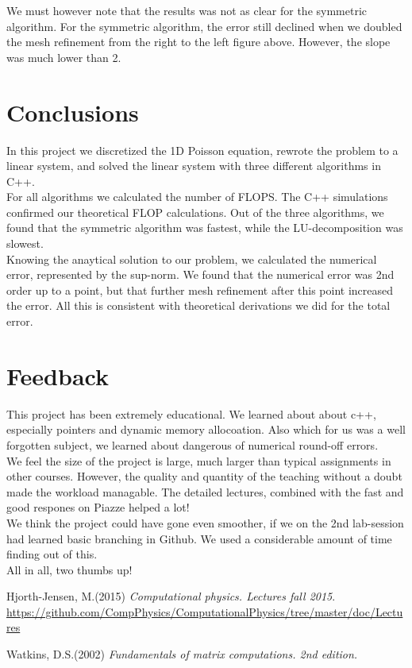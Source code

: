 \documentclass{article}
\begin{document}
We must however note that the results was not as clear for the symmetric algorithm. For the symmetric algorithm, the error still declined when we doubled the mesh refinement from the right to the left figure above. However, the slope was much lower than 2.

\section{Conclusions}
In this project we discretized the 1D Poisson equation, rewrote the problem to a linear system, and solved the linear system with three different algorithms in C++.\\

For all algorithms we calculated the number of FLOPS. The C++ simulations confirmed our theoretical FLOP calculations. Out of the three algorithms, we found that the symmetric algorithm was fastest, while the LU-decomposition was slowest. \\

Knowing the anaytical solution to our problem, we calculated the numerical error, represented by the sup-norm. We found that the numerical error was 2nd order up to a point, but that further mesh refinement after this point increased the error. All this is consistent with theoretical derivations we did for the total error. 

\section{Feedback}
This project has been extremely educational. We learned about about c++, especially pointers and dynamic memory allocoation. Also which for us was a well forgotten subject, we learned about dangerous of numerical round-off errors. \\

We feel the size of the project is large, much larger than typical assignments in other courses. However, the quality and quantity of the teaching without a doubt made the workload managable. The detailed lectures, combined with the fast and good respones on Piazze helped a lot!\\

We think the project could have gone even smoother, if we on the 2nd lab-session had learned basic branching in Github. We used a considerable amount of time finding out of this.\\

All in all, two thumbs up!

\pagebreak
\begin{thebibliography}{9}
	Hjorth-Jensen, M.(2015)
	\textit{Computational physics. Lectures fall 2015}. 
	\url{https://github.com/CompPhysics/ComputationalPhysics/tree/master/doc/Lectures}
	
	Watkins, D.S.(2002)
	\textit{Fundamentals of matrix computations. 2nd edition.}

\end{thebibliography}
\end{document}
